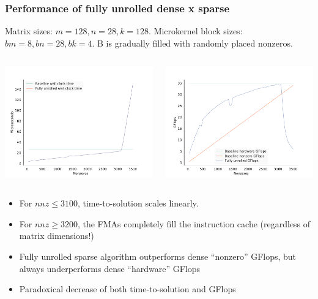 \documentclass[9pt]{beamer}
\begin{document}
\begin{frame}[fragile]
  \frametitle{Performance of fully unrolled dense x sparse}
  Matrix sizes: $m=128, n=28, k=128$.
  Microkernel block sizes: $bm=8, bn=28, bk=4$.
  B is gradually filled with randomly placed nonzeros.

  \begin{columns}[t]
    \begin{column}{0.6\textwidth}
      \centering
      \includegraphics[width=6.5cm]{images/fig2.pdf}
    \end{column}
    \begin{column}{0.6\textwidth}
      \centering
      \includegraphics[width=6.5cm]{images/fig3.pdf}
    \end{column}
  \end{columns}

  \begin{itemize}
    \item For $nnz \leq 3100$, time-to-solution scales linearly.
    \item For $nnz \geq 3200$, the FMAs completely fill the instruction cache (regardless of matrix dimensions!)
    \item Fully unrolled sparse algorithm outperforms dense ``nonzero'' GFlops, but always underperforms dense ``hardware'' GFlops
    \item Paradoxical decrease of both time-to-solution and GFlops
    

  \end{itemize}
\end{frame}
\end{document}
